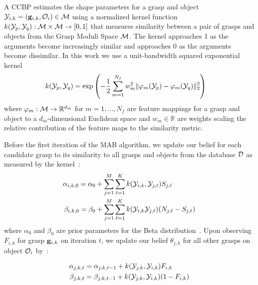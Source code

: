 A CCBP estimates the shape parameters for a grasp and object $\mathcal{Y}_{i,k} = (\mathbf{g}_{i,k}, \mathcal{O}_{i}) \in \mathcal{M}$ using a normalized kernel function $k(\mathcal{Y}_p, \mathcal{Y}_q) : \mathcal{M} \times \mathcal{M} \rightarrow [0,1]$ that measures similarity between a pair of grasps and objects from the Grasp Moduli Space $\mathcal{M}$.
The kernel approaches 1 as the arguments become increasingly similar and approaches 0 as the arguments become dissimilar.
In this work we use a unit-bandwidth squared exponential kernel 
\begin{align*}
	k(\mathcal{Y}_p, \mathcal{Y}_q) &= \exp\left( - \frac{1}{2} \sum \limits_{m=1}^{N_f} w_m^2 \|\varphi_m(\mathcal{Y}_p) - \varphi_m(\mathcal{Y}_q)\|_2^2 \right)
\end{align*}
\noindent where $\varphi_m: \mathcal{M} \rightarrow \mathbb{R}^{d_m}$ for $m = 1, ..., N_f$ are feature mappings for a grasp and object to a $d_m$-dimensional Euclidean space and $w_m \in \mathbb{R}$ are weights scaling the relative contribution of the feature maps to the similarity metric.

Before the first iteration of the MAB algorithm, we update our belief for each candidate grasp to its similarity to all grasps and objects from the database $\mathcal{D}$ as measured by the kernel~\cite{goetschalckx2011continuous}:
\begin{align}
	\alpha_{i,k,0} = \alpha_{0} & + \sum \limits_{j=1}^M \sum \limits_{\ell=1}^K k(\mathcal{Y}_{i,k}, \mathcal{Y}_{j,\ell}) S_{j,\ell} \label{eq:alpha-prior} \\
	\beta_{i,k,0} = \beta_{0} & + \sum \limits_{j=1}^M \sum \limits_{\ell=1}^K  k(\mathcal{Y}_{i,k} \mathcal{Y}_{j,\ell}) (N_{j,\ell} - S_{j,\ell}) \label{eq:beta-prior}
\end{align}
\noindent where $\alpha_{0}$ and $\beta_{0}$ are prior parameters for the Beta distribution~\cite{laskey2015bandits}.
Upon observing $F_{i,k}$ for grasp $\mathbf{g}_{i,k}$ on iteration $t$, we update our belief $\theta_{j,k}$ for all other grasps on object $\mathcal{O}_i$ by~\cite{goetschalckx2011continuous}:

\vspace{-2ex}
\begin{align}
	\alpha_{j,k,t} &= \alpha_{j,k,t-1} + k(\mathcal{Y}_{j,k}, \mathcal{Y}_{i,k}) F_{i,k} \label{eq:alpha} \\
	\beta_{j,k,t} &= \beta_{j,k,t-1} + k(\mathcal{Y}_{j,k}, \mathcal{Y}_{i,k}) (1 - F_{i,k})\label{eq:beta}
\end{align}

